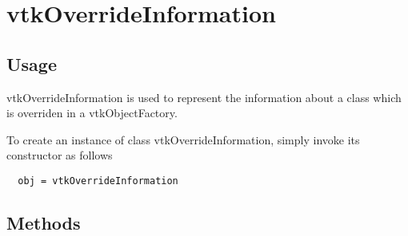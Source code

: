 \section{vtkOverrideInformation}

\subsection{Usage}

 vtkOverrideInformation is used to represent the information about
 a class which is overriden in a vtkObjectFactory.


To create an instance of class vtkOverrideInformation, simply
invoke its constructor as follows
\begin{verbatim}
  obj = vtkOverrideInformation
\end{verbatim}
\subsection{Methods}

